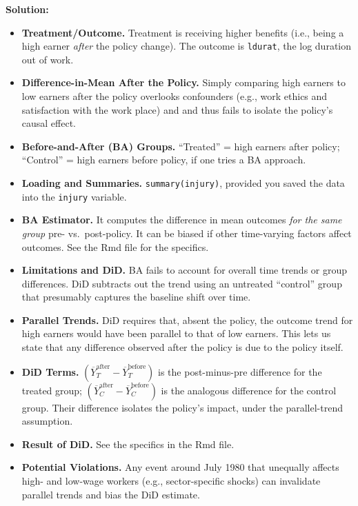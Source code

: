 \documentclass[12pt]{article}
\begin{document}
\noindent \textbf{Solution:}
\begin{itemize}
  \item \textbf{Treatment/Outcome.} Treatment is receiving higher benefits (i.e., being a high earner \emph{after} the policy change). The outcome is \texttt{ldurat}, the log duration out of work.
  \item \textbf{Difference-in-Mean After the Policy.} Simply comparing high earners to low earners after the policy overlooks confounders (e.g., work ethics and satisfaction with the work place) and and thus fails to isolate the policy’s causal effect.
  \item \textbf{Before-and-After (BA) Groups.} “Treated” = high earners after policy; “Control” = high earners before policy, if one tries a BA approach. 
  \item \textbf{Loading and Summaries.} \texttt{summary(injury)}, provided you saved the data into the \texttt{injury} variable. 
  \item \textbf{BA Estimator.} It computes the difference in mean outcomes \emph{for the same group} pre- vs.\ post-policy. It can be biased if other time-varying factors affect outcomes. See the Rmd file for the specifics. 
  \item \textbf{Limitations and DiD.} BA fails to account for overall time trends or group differences. DiD subtracts out the trend using an untreated “control” group that presumably captures the baseline shift over time.
  \item \textbf{Parallel Trends.} DiD requires that, absent the policy, the outcome trend for high earners would have been parallel to that of low earners. This lets us state that any difference observed after the policy is due to the policy itself.
  \item \textbf{DiD Terms.} $(\overline{Y}_T^{\mathrm{after}} - \overline{Y}_T^{\mathrm{before}})$ is the post-minus-pre difference for the treated group; $(\overline{Y}_C^{\mathrm{after}} - \overline{Y}_C^{\mathrm{before}})$ is the analogous difference for the control group. Their difference isolates the policy’s impact, under the parallel-trend assumption.
  \item \textbf{Result of DiD.} See the specifics in the Rmd file.
  \item \textbf{Potential Violations.} Any event around July 1980 that unequally affects high- and low-wage workers (e.g., sector-specific shocks) can invalidate parallel trends and bias the DiD estimate.
\end{itemize}
\end{document}
